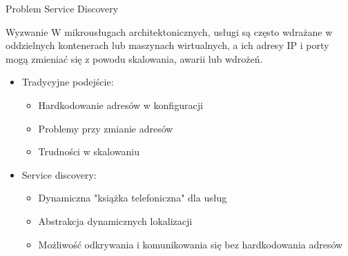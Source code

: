 \documentclass[aspectratio=169]{beamer}
\begin{document}
\begin{frame}{Problem Service Discovery}
    \begin{block}{Wyzwanie}
        W mikrousługach architektonicznych, usługi są często wdrażane w oddzielnych kontenerach lub maszynach wirtualnych, a ich adresy IP i porty mogą zmieniać się z powodu skalowania, awarii lub wdrożeń.
    \end{block}
    
    \begin{itemize}
        \item Tradycyjne podejście:
        \begin{itemize}
            \item Hardkodowanie adresów w konfiguracji
            \item Problemy przy zmianie adresów
            \item Trudności w skalowaniu
        \end{itemize}
        \vspace{0.3cm}
        \item Service discovery:
        \begin{itemize}
            \item Dynamiczna "książka telefoniczna" dla usług
            \item Abstrakcja dynamicznych lokalizacji
            \item Możliwość odkrywania i komunikowania się bez hardkodowania adresów
        \end{itemize}
    \end{itemize}
\end{frame}
\end{document}
